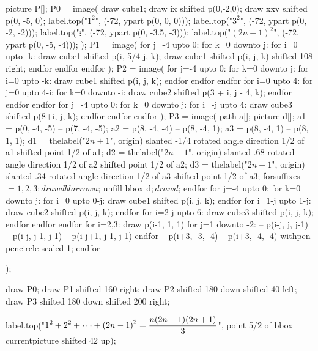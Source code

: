 \documentclass[oneside]{scrbook}
\begin{document}
picture P[];
P0 = image(
    draw cube1;
    draw ix shifted p(0,-2,0);
    draw xxv shifted p(0, -5, 0);
    label.top("$1^2$",      (-72, ypart p(0,  0,  0)));
    label.top("$3^2$",      (-72, ypart p(0, -2, -2)));
    label.top("$\vdots$",   (-72, ypart p(0, -3.5, -3)));
    label.top("$(2n-1)^2$", (-72, ypart p(0, -5, -4)));
);
P1 = image(
    for j=-4 upto 0:
        for k=0 downto j:
            for i=0 upto -k:
                draw cube1 shifted p(i, 5/4 j, k);
                draw cube1 shifted p(i, j, k) shifted 108 right;
            endfor
        endfor
    endfor
);
P2 = image(
    for j=-4 upto 0:
        for k=0 downto j:
            for i=0 upto -k:
                draw cube1 shifted p(i, j, k);
            endfor
        endfor
    endfor
    for i=0 upto 4:
        for j=0 upto 4-i:
            for k=0 downto -i:
                draw cube2 shifted p(3 + i, j - 4, k);
            endfor
        endfor
    endfor
    for j=-4 upto 0:
        for k=0 downto j:
            for i=-j upto 4:
                draw cube3 shifted p(8+i, j, k);
            endfor
        endfor
    endfor
);
P3 = image(
    path a[]; picture d[];
    a1 = p(0, -4, -5) -- p(7, -4, -5);
    a2 = p(8, -4, -4) -- p(8, -4, 1);
    a3 = p(8, -4, 1) -- p(8, 1, 1);
    d1 = thelabel("$\scriptstyle 2n+1$", origin) slanted -1/4 rotated angle direction 1/2 of a1 shifted point 1/2 of a1;
    d2 = thelabel("$\scriptstyle 2n-1$", origin) slanted  .68 rotated angle direction 1/2 of a2 shifted point 1/2 of a2;
    d3 = thelabel("$\scriptstyle 2n-1$", origin) slanted  .34 rotated angle direction 1/2 of a3 shifted point 1/2 of a3;
    forsuffixes $=1,2,3:
        drawdblarrow a$; unfill bbox d$; draw d$;
    endfor
    for j=-4 upto 0:
        for k=0 downto j:
            for i=0 upto 0-j:
                draw cube1 shifted p(i, j, k);
            endfor
            for i=1-j upto 1-j:
                draw cube2 shifted p(i, j, k);
            endfor
            for i=2-j upto 6:
                draw cube3 shifted p(i, j, k);
            endfor
        endfor
    endfor
    for i=2,3:
        draw p(i-1, 1, 1) 
            for j=1 downto -2:
                -- p(i-j, j, j-1) -- p(i-j, j-1, j-1) -- p(i-j+1, j-1, j-1)
            endfor
                -- p(i+3, -3, -4) -- p(i+3, -4, -4)
        withpen pencircle scaled 1;
    endfor


);

draw P0;
draw P1 shifted 160 right;
draw P2 shifted 180 down shifted 40 left;
draw P3 shifted 180 down shifted 200 right;

label.top("$\displaystyle 1^2 + 2^2 + \cdots + \left(2n-1\right)^2 = {n(2n-1)(2n+1)\over3}$", 
          point 5/2 of bbox currentpicture shifted 42 up);
\end{document}
